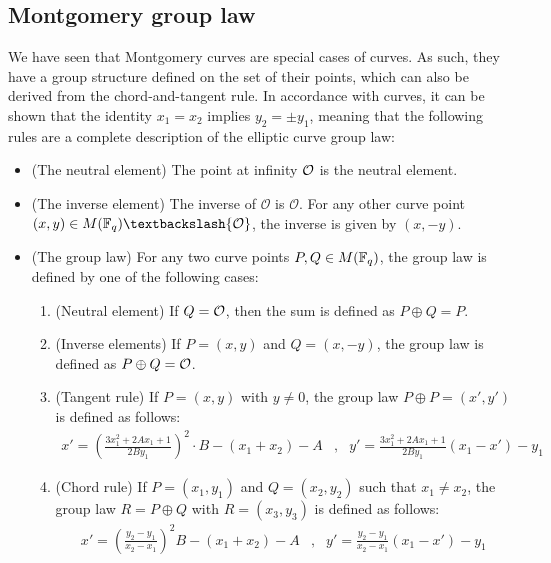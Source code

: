 \subsection{Montgomery group law} We have seen that Montgomery curves are special cases of  curves. As such, they have a group structure defined on the set of their points, which can also be derived from the chord-and-tangent rule. In accordance with  curves, it can be shown that the identity $x_1=x_2$ implies $y_2=\pm y_1$, meaning that the following rules are a complete description of the elliptic curve group law:

\begin{definition}\label{def:montgomery-group-law}

\begin{itemize}
\item (The neutral element) The point at infinity $\mathcal{O}$ is the neutral element.
\item (The inverse element) The inverse of $\mathcal{O}$ is $\mathcal{O}$. For any other curve point $(x,y) \in M(\F_q)\textbackslash \{\mathcal{O}\}$, the inverse is given by $(x,-y)$.
\item (The group law) For any two curve points $P, Q \in M(\mathbb{F}_q)$, the group law is defined by one of the following cases:
\begin{enumerate}
\item (Neutral element) If $Q=\mathcal{O}$, then the sum is defined as $P\oplus Q=P$.
\item (Inverse elements)  If $P=(x,y)$ and $Q=(x,-y)$, the group law is defined as $P\oplus Q=\mathcal{O}$.
\item (Tangent rule) If $P=(x,y)$ with $y\neq 0$, the group law $P\oplus P=(x',y')$ is defined as follows:
$$
\begin{array}{llr}
x' = (\frac{3x_1^2 + 2A x_1 +1}{2By_1})^2\cdot B - (x_1 + x_2) - A &,&
y' = \frac{3x_1^2 + 2A x_1 +1}{2By_1}(x_1-x') - y_1
\end{array} 
$$
\item (Chord rule) If $P=(x_1,y_1)$ and $Q=(x_2,y_2)$ such that $x_1 \neq x_2$, the group law $R=P\oplus Q$ with $R=(x_3,y_3)$ is defined as follows:
$$
\begin{array}{llr}
x' = (\frac{y_2-y_1}{x_2-x_1})^2B - (x_1 + x_2) - A &, &
y' = \frac{y_2-y_1}{x_2-x_1}(x_1-x') - y_1
\end{array} 
$$
\end{enumerate}
\end{itemize}
\end{definition}
